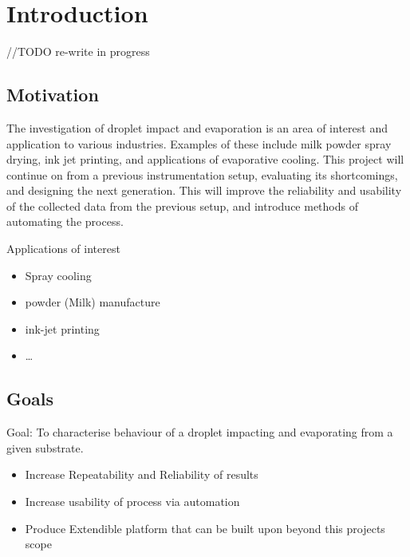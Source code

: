 \chapter{Introduction}\label{C:intro}

//TODO re-write in progress

\section{Motivation}

The investigation of droplet impact and evaporation is an area of interest and application to various industries. Examples of these include milk powder spray drying, ink jet printing, and applications of evaporative cooling. This project will continue on from a previous instrumentation setup, evaluating its shortcomings, and designing the next generation. This will improve the reliability and usability of the collected data from the previous setup, and introduce methods of automating the process.

Applications of interest
\begin{itemize}
    \item Spray cooling
    \item  powder (Milk) manufacture
    \item ink-jet printing
    \item \dots
\end{itemize}

\section{Goals}
Goal: To characterise behaviour of a droplet impacting and evaporating from a given substrate.
\begin{itemize}
    \item Increase Repeatability and Reliability of results
    \item Increase usability of process via automation
    \item Produce Extendible platform that can be built upon beyond this projects scope
\end{itemize}